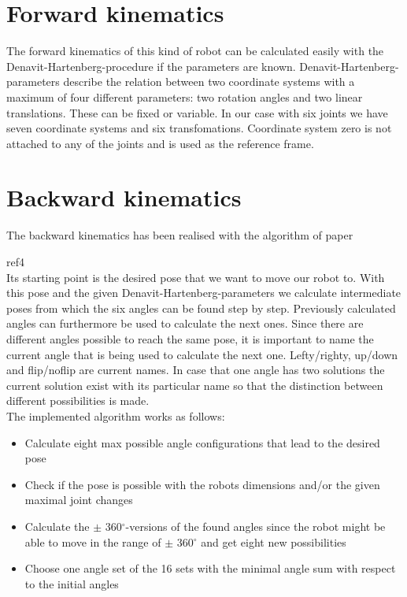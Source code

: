 \section{Forward kinematics}
The forward kinematics of this kind of robot can be calculated easily with the Denavit-Hartenberg-procedure if the parameters are known. Denavit-Hartenberg-parameters describe the relation between two coordinate systems with a maximum of four different parameters: two rotation angles 
and two linear translations. These can be fixed or variable. In our case with six joints we have seven coordinate systems and six transfomations. Coordinate system zero is not attached to any of the joints and is used as the reference frame. \\

\section{Backward kinematics}
The backward kinematics has been realised with the algorithm of paper 

ref4 \\
 
Its starting point is the desired pose that we want to move our robot to. 
With this pose and the given Denavit-Hartenberg-parameters we calculate intermediate
poses from which the six angles can be found step by step. Previously calculated angles can furthermore be used to calculate the next ones. Since there are different angles possible to reach the same pose, it is important to name the current angle that is being used to calculate the next one. Lefty/righty, up/down and flip/noflip are current names. In case that one angle has two solutions the current solution exist with its particular name so
that the distinction between different possibilities is made. \\

The implemented algorithm works as follows:

\begin{itemize}
	\item Calculate eight max possible angle configurations that lead to the desired pose 
	\item Check if the pose is possible with the robots dimensions and/or the given maximal joint changes
	\item Calculate the $\pm$ 360$^\circ$-versions of the found angles since the robot might be able 
	to move in the range of $\pm$ 360$^\circ$ and get eight new possibilities
	\item Choose one angle set of the 16 sets with the minimal angle sum with respect to the initial angles
\end{itemize}